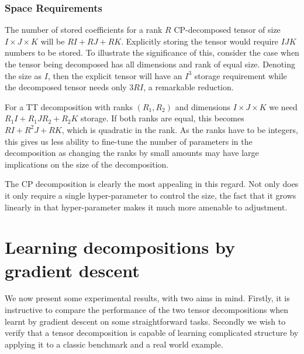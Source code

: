 
\subsubsection{Space Requirements}
The number of stored coefficients for a rank \(R\) CP-decomposed tensor of size 
\(I \times J \times K\) will be \(RI + RJ + RK\). Explicitly storing the tensor would require
\(IJK\) numbers to be stored. To illustrate the significance of this, consider the case when
the tensor being decomposed has all dimensions and rank of equal size. Denoting the size as
\(I\), then the explicit tensor will have an \(I^3\) storage requirement while the decomposed
tensor needs only \(3RI\), a remarkable reduction.

For a TT decomposition with ranks \((R_1, R_2)\) and dimensions \(I \times J \times K\) we need
\(R_1I + R_1JR_2 + R_2K\) storage. If both ranks are equal, this becomes \(RI + R^2J + RK\), which
is quadratic in the rank. As the ranks have to be integers, this gives us less ability to fine-tune the
number of parameters in the decomposition as changing the ranks by small amounts may have large
implications on the size of the decomposition.

The CP decomposition is clearly the most appealing in this regard. Not only does it only require a
single hyper-parameter to control the size, the fact that it grows linearly in that hyper-parameter
makes it much more amenable to adjustment.

\section{Learning decompositions by gradient descent}
We now present some experimental results, with two aims in mind. Firstly, it is instructive to compare
the performance of the two tensor decompositions when learnt by gradient descent on some
straightforward tasks. Secondly we wish to verify that a tensor decomposition is capable of learning
complicated structure by applying it to a classic benchmark and a real world example.

